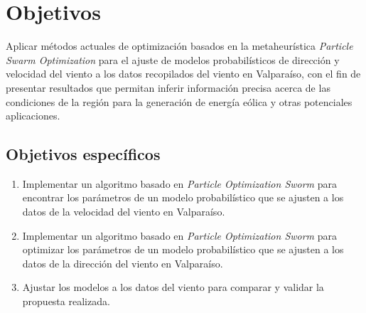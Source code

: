\section{Objetivos}
Aplicar métodos actuales de optimización basados en la metaheurística \emph{Particle Swarm Optimization} para el ajuste de modelos probabilísticos de dirección y velocidad del viento a los datos recopilados del viento en Valparaíso, con el fin de presentar resultados que permitan inferir información precisa acerca de las condiciones de la región para la generación de energía eólica y otras potenciales aplicaciones.

\subsection{Objetivos específicos}
\begin{enumerate}
    \item Implementar un algoritmo basado en \emph{Particle Optimization Sworm} para encontrar los parámetros de un modelo probabilístico que se ajusten a los datos de la velocidad del viento en Valparaíso. 
    \item Implementar un algoritmo basado en \emph{Particle Optimization Sworm} para optimizar los parámetros de un modelo probabilístico que se ajusten a los datos de la dirección del viento en Valparaíso.
    \item Ajustar los modelos a los datos del viento para comparar y validar la propuesta realizada.
\end{enumerate}

